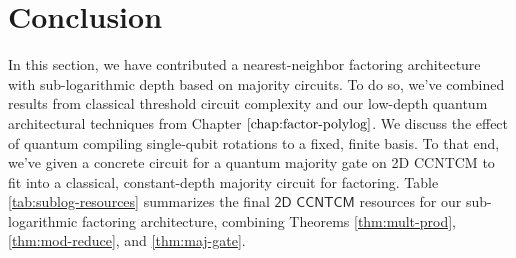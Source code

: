 \section{Conclusion}
\label{sec:fsl-conclude}

In this section, we have contributed a nearest-neighbor factoring architecture with
sub-logarithmic depth based on majority circuits. To do so, we've combined results from classical threshold
circuit complexity and our low-depth quantum architectural techniques from
Chapter $\ref{chap:factor-polylog}$.
We discuss the effect of quantum compiling single-qubit rotations to a fixed, finite basis.
To that end, we've given a concrete circuit for
a quantum majority gate on \textsf{2D CCNTCM} to fit into a classical, constant-depth majority circuit
for factoring. Table \ref{tab:sublog-resources} summarizes the final $\textsf{2D CCNTCM}$ resources for our sub-logarithmic
factoring architecture, combining Theorems \ref{thm:mult-prod}, \ref{thm:mod-reduce}, and \ref{thm:maj-gate}.

